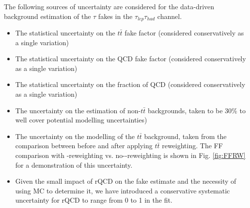 The following sources of uncertainty are considered for the data-driven background estimation of the $\tau$ fakes in the $\tau_{lep}\tau_{had}$ channel.

\begin{itemize}
\item The statistical uncertainty on the $t\bar{t}$ fake factor (considered conservatively as a single variation)
\item The statistical uncertainty on the QCD fake factor (considered conservatively as a single variation)
\item The statistical uncertainty on the fraction of QCD (considered conservatively as a single variation)
\item The uncertainty on the estimation of non-$t\bar{t}$ backgrounds, taken to be 30\% to well cover potential modelling uncertainties)
\item The uncertainty on the modelling of the $t\bar{t}$ background, taken from the comparison between before and after applying $t\bar{t}$ reweighting. 
         The FF comparison with \ttbar-reweighting vs. no-\ttbar-reweighting is shown in Fig. \ref{fig:FFRW} for a demonstration of this uncertainty.  
\item  Given the small impact of rQCD on the fake estimate and the necessity of using MC to determine it, we have introduced a conservative systematic uncertainty for rQCD to range from 0 to 1 in the fit.
\end{itemize}

